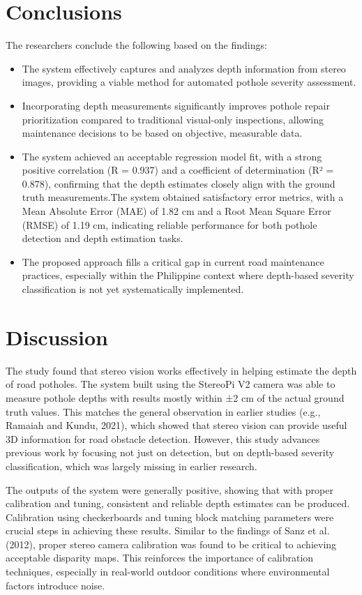 \section{Conclusions}
The researchers conclude the following based on the findings:

\begin{itemize}
	\item The system effectively captures and analyzes depth information from stereo images, providing a viable method for automated pothole severity assessment.
	
	\item Incorporating depth measurements significantly improves pothole repair prioritization compared to traditional visual-only inspections, allowing maintenance decisions to be based on objective, measurable data.
	\item The system achieved an acceptable regression model fit, with a strong positive correlation (R = 0.937) and a coefficient of determination (R² = 0.878), confirming that the depth estimates closely align with the ground truth measurements.The system obtained satisfactory error metrics, with a Mean Absolute Error (MAE) of 1.82 cm and a Root Mean Square Error (RMSE) of 1.19 cm, indicating reliable performance for both pothole detection and depth estimation tasks.
	\item The proposed approach fills a critical gap in current road maintenance practices, especially within the Philippine context where depth-based severity classification is not yet systematically implemented.
\end{itemize}

\section{Discussion}
The study found that stereo vision works effectively in helping estimate the depth of road potholes. The system built using the StereoPi V2 camera was able to measure pothole depths with results mostly within ±2 cm of the actual ground truth values. This matches the general observation in earlier studies (e.g., Ramaiah and Kundu, 2021), which showed that stereo vision can provide useful 3D information for road obstacle detection. However, this study advances previous work by focusing not just on detection, but on depth-based severity classification, which was largely missing in earlier research.

The outputs of the system were generally positive, showing that with proper calibration and tuning, consistent and reliable depth estimates can be produced. Calibration using checkerboards and tuning block matching parameters were crucial steps in achieving these results. Similar to the findings of Sanz et al. (2012), proper stereo camera calibration was found to be critical to achieving acceptable disparity maps. This reinforces the importance of calibration techniques, especially in real-world outdoor conditions where environmental factors introduce noise.

